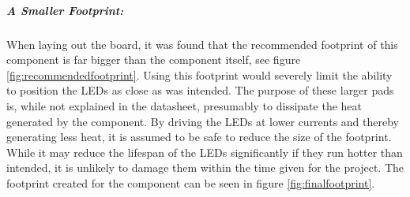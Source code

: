 \subparagraph{A Smaller Footprint:}
When laying out the board, it was found that the recommended footprint of this component is far bigger than the component itself, see figure \ref{fig:recommendedfootprint}.
Using this footprint would severely limit the ability to position the LEDs as close as was intended.
The purpose of these larger pads is, while not explained in the datasheet, presumably to dissipate the heat generated by the component.
By driving the LEDs at lower currents and thereby generating less heat, it is assumed to be safe to reduce the size of the footprint.
While it may reduce the lifespan of the LEDs significantly if they run hotter than intended, it is unlikely to damage them within the time given for the project.
The footprint created for the component can be seen in figure 
\ref{fig:finalfootprint}.

